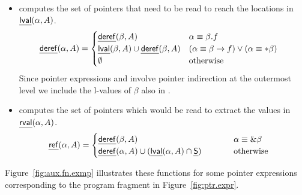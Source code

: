\documentclass[a4paper,11pt,fleqn]{article}
\begin{document}
\begin{itemize}
\item {} computes the set of pointers that need
       to be read to reach the locations in $\text{\sf\em lval\/}(\alpha,A)$.
\begin{align}
\text{\sf\em deref\/}(\alpha,A) & =  
		\begin{cases}
		\text{\sf\em deref\/}(\beta,A) 
				& \alpha \equiv \beta.f
			\\
		\text{\sf\em lval\/}(\beta,A) \cup \text{\sf\em deref\/}(\beta,A) 
				& (\alpha \equiv \beta\rightarrow f)  \vee (\alpha \equiv *\beta) 
			\\
		\emptyset	& \text{otherwise}
		\end{cases}
		\label{eq:derefp.heap}
\end{align}
Since pointer expressions  and 
\text{$*\beta$} involve pointer indirection at the outermost level we
include the l-values of $\beta$ also in \derefp.

\item {} computes the set of pointers which would
       be read to extract the values in $\text{\sf\em rval\/}(\alpha,A)$.
\begin{align}
\refp(\alpha,A) & =  
		\begin{cases}
		\derefp(\beta,A) 
			& \alpha \equiv \&\beta
			\\
		\derefp(\alpha,A) \cup \left(\lval(\alpha,A) \cap \source\right)
			\hspace*{10mm}
			&	\text{otherwise}
		\end{cases}
\label{eq:refp.heap}
\end{align}
\end{itemize}

Figure~\ref{fig:aux.fn.exmp} illustrates these functions for 
some pointer expressions corresponding to the program fragment in Figure~\protect\ref{fig:ptr.expr}.
\end{document}
